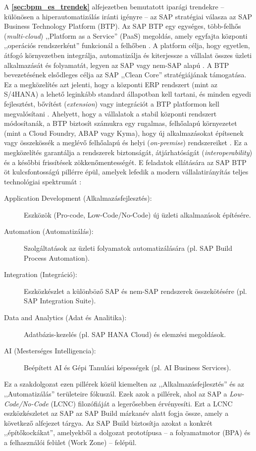 A \textbf{\ref{sec:bpm_es_trendek}} alfejezetben bemutatott iparági trendekre – különösen a hiperautomatizálás iránti igényre – az SAP stratégiai válasza az SAP Business Technology Platform (BTP).
Az SAP BTP egy egységes, több-felhős (\textit{multi-cloud}) ,,Platform as a Service'' (PaaS) megoldás, amely egyfajta központi ,,operációs rendszerként'' funkcionál a felhőben \cite{SAP-BTP-Portfolio, Medium-Cloud-Terminologies}.
A platform célja, hogy egyetlen, átfogó környezetben integrálja, automatizálja és kiterjessze a vállalat összes üzleti alkalmazását és folyamatát, legyen az SAP vagy nem-SAP alapú \cite{SAP-BTP-Definition}.
A BTP bevezetésének elsődleges célja az SAP ,,Clean Core'' stratégiájának támogatása.
Ez a megközelítés azt jelenti, hogy a központi ERP rendszert (mint az S/4HANA) a lehető leginkább standard állapotban kell tartani, és minden egyedi fejlesztést, bővítést (\textit{extension}) vagy integrációt a BTP platformon kell megvalósítani \cite{NAVIT-BTP, SAP-BTP-for-Beginner}.
Ahelyett, hogy a vállalatok a stabil központi rendszert módosítanák, a BTP biztosít számukra egy rugalmas, felhőalapú környezetet (mint a Cloud Foundry, ABAP vagy Kyma), hogy új alkalmazásokat építsenek vagy összekössék a meglévő felhőalapú és helyi (\textit{on-premise}) rendszereiket \cite{SAP-BTP-Features}.
Ez a megközelítés garantálja a rendszerek biztonságát, átjárhatóságát (\textit{interoperability}) és a későbbi frissítések zökkenőmentességét.
E feladatok ellátására az SAP BTP öt kulcsfontosságú pillérre épül, amelyek lefedik a modern vállalatirányítás teljes technológiai spektrumát \cite{SAP-BTP-for-Beginner}:
\begin{description}
    \item[Application Development (Alkalmazásfejlesztés):] Eszközök (Pro-code, Low-Code/No-Code) új üzleti alkalmazások építésére.
\item[Automation (Automatizálás):] Szolgáltatások az üzleti folyamatok automatizálására (pl. SAP Build Process Automation).
\item[Integration (Integráció):] Eszközkészlet a különböző SAP és nem-SAP rendszerek összekötésére (pl. SAP Integration Suite).
\item[Data and Analytics (Adat és Analitika):] Adatbázis-kezelés (pl. SAP HANA Cloud) és elemzési megoldások.
\item[AI (Mesterséges Intelligencia):] Beépített AI és Gépi Tanulási képességek (pl. AI Business Services).
\end{description}

Ez a szakdolgozat ezen pillérek közül kiemelten az ,,Alkalmazásfejlesztés'' és az ,,Automatizálás'' területeire fókuszál.
Ezek azok a pillérek, ahol az SAP a \textit{Low-Code/No-Code} (LCNC) filozófiáját a legerősebben érvényesíti.
Ezt a LCNC eszközkészletet az SAP az SAP Build márkanév alatt fogja össze, amely a következő alfejezet tárgya.
Az SAP Build biztosítja azokat a konkrét ,,építőkockákat'', amelyekből a dolgozat prototípusa – a folyamatmotor (BPA) és a felhasználói felület (Work Zone) – felépül.


